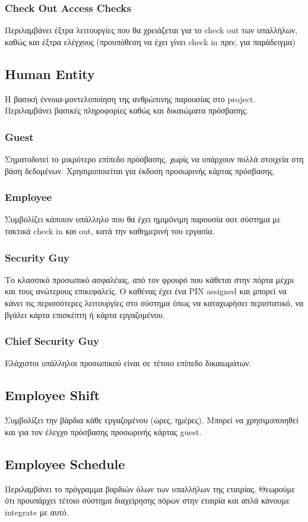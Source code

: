 \documentclass{article}
\begin{document}
\subsubsection{Check Out Access Checks}
Περιλαμβάνει έξτρα λειτουργίες που θα χρειάζεται για το check out των υπαλλήλων, καθώς και έξτρα ελέγχους (προυπόθεση να έχει γίνει check in πριν, για παράδειγμα)
\subsection{Human Entity}
Η βασική έννοια-μοντελοποίηση της ανθρώπινης παρουσίας στο project. Περιλαμβάνει βασικές πληροφορίες καθώς και δικαιώματα πρόσβασης.
\subsubsection{Guest}
Σηματοδοτεί το μικρότερο επίπεδο πρόσβασης, χωρίς να υπάρχουν πολλά στοιχεία στη βάση δεδομένων. Χρησιμοποιείται για έκδοση προσωρινής κάρτας πρόσβασης.
\subsubsection{Employee}
Συμβολίζει κάποιον υπάλληλο που θα έχει ημιμόνιμη παρουσία σοτ σύστημα με τακτικά check in και out, κατά την καθημερινή του εργασία.
\subsubsection{Security Guy}
Το κλασσικό προσωπικό ασφαλέιας, από τον φρουρό που κάθεται στην πόρτα μέχρι και τους ανώτερους επικεφαλείς. Ο καθένας έχει ένα PIN assigned και μπορεί να κάνει τις περισσότερες λειτουργίες στο σύστημα όπως να καταχωρήσει περιστατικό, να βγάλει κάρτα επισκέπτη ή κάρτα εργαζομένου.

\subsubsection{Chief Security Guy}
Ελάχιστοι υπάλληλοι προσωπικού είναι σε τέτοιο επίπεδο δικαιωμάτων. 

\subsection{Employee Shift}
Συμβολίζει την βάρδια κάθε εργαζομένου (ώρες, ημέρες). Μπορεί να χρησιμοποιηθεί και για τον έλεγχο πρόσβασης προσωρινής κάρτας guest.

\subsection{Employee Schedule}
Περιλαμβάνει το πρόγραμμα βαρδιών όλων των υπαλλήλων της εταιρίας. Θεωρούμε ότι προυπάρχει τέτοιο σύστημα διαχείρησης πόρων στην εταιρία και απλά κάνουμε integrate με αυτό.
\end{document}
